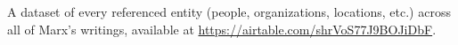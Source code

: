 A dataset of every referenced entity (people, organizations, locations, etc.) across all of Marx's writings, available at \href{https://airtable.com/shrVoS77J9BOJiDbF}{https://airtable.com/shrVoS77J9BOJiDbF}.

